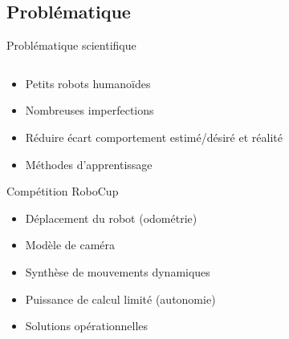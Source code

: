 
\subsection{Problématique}

\begin{frame}{Problématique scientifique}
    \begin{columns}
        \begin{column}{0.56\linewidth}
            \begin{description}
                \setlength\itemsep{1em}
                \item[Difficultés]
                    \begin{itemize}
                        \item Petits robots humanoïdes
                        \item Nombreuses imperfections
                    \end{itemize}
                \item[Problème] 
                    \begin{itemize}
                        \item Réduire écart comportement estimé/désiré et réalité
                        \item Méthodes d'apprentissage
                    \end{itemize}
                \item[Applications] Compétition RoboCup
                    \begin{itemize}
                        \item Déplacement du robot (odométrie)
                        \item Modèle de caméra
                        \item Synthèse de mouvements dynamiques
                    \end{itemize}
                \item[Contexte]
                    \begin{itemize}
                        \item Puissance de calcul limité (autonomie)
                        \item Solutions opérationnelles
                    \end{itemize}
            \end{description}
        \end{column}
        \begin{column}{0.44\linewidth}
            \centering

\end{column}
\end{columns}
\end{frame}
